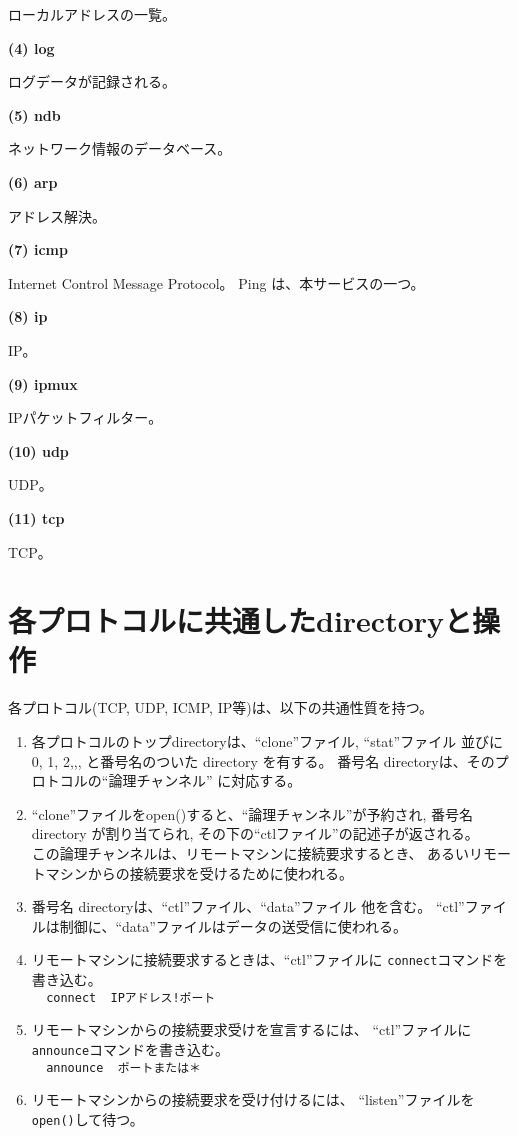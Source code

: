    ローカルアドレスの一覧。

{\bf \flushleft(4) log}

   ログデータが記録される。

{\bf \flushleft(5) ndb}

  ネットワーク情報のデータベース。

{\bf \flushleft(6) arp}

   アドレス解決。

{\bf \flushleft(7) icmp}
  
    Internet Control Message Protocol。
    Ping は、本サービスの一つ。

{\bf \flushleft(8) ip}

    IP。　

{\bf \flushleft(9) ipmux}

   IPパケットフィルター。

{\bf \flushleft(10) udp}

    UDP。

{\bf \flushleft(11) tcp}

    TCP。



\section{各プロトコルに共通したdirectoryと操作}

各プロトコル(TCP, UDP, ICMP, IP等)は、以下の共通性質を持つ。

\begin{enumerate}
\item  各プロトコルのトップdirectoryは、``clone''ファイル, ``stat''ファイル
  並びに 0, 1, 2,,, と番号名のついた directory を有する。
  番号名 directoryは、そのプロトコルの``論理チャンネル'' に対応する。

\item  ``clone''ファイルをopen()すると、``論理チャンネル''が予約され, 
  番号名 directory が割り当てられ, 
  その下の``ctlファイル''の記述子が返される。\\
  この論理チャンネルは、リモートマシンに接続要求するとき、
  あるいリモートマシンからの接続要求を受けるために使われる。

\item  番号名 directoryは、``ctl''ファイル、``data''ファイル 他を含む。
      ``ctl''ファイルは制御に、``data''ファイルはデータの送受信に使われる。

\item  リモートマシンに接続要求するときは、``ctl''ファイルに
    {\tt connect}コマンドを書き込む。\\
     \verb|  connect  IPアドレス!ポート  | 

\item  リモートマシンからの接続要求受けを宣言するには、
        ``ctl''ファイルに{\tt announce}コマンドを書き込む。\\
     \verb|  announce  ポートまたは＊  | 
    
\item  リモートマシンからの接続要求を受け付けるには、
  ``listen''ファイルを{\tt open()}して待つ。

\end{enumerate}



